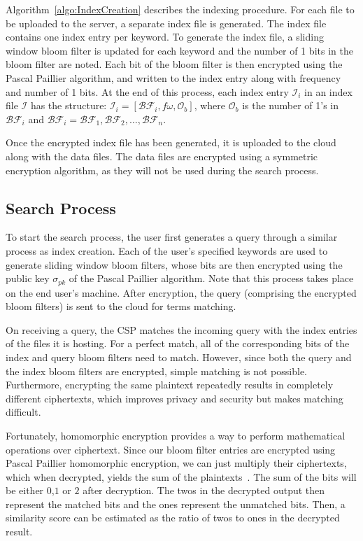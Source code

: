 Algorithm~\ref{algo:IndexCreation} describes the indexing procedure.
For each file to be uploaded to the server, a separate index file is generated. The index
file contains one index entry per keyword. To generate the index file, a sliding window bloom
filter is updated for each keyword and the number of 1 bits in the bloom filter are noted.
Each bit of the bloom filter is then encrypted using the Pascal Paillier algorithm, and written to 
the index entry along with frequency and number of 1 bits.
At the end of this process, each index entry $\mathcal{I}_i$ in an index file $\mathcal{I}$ has
the structure: 
$
\mathcal{I}_i = [\mathcal{BF}_i, f\omega,\mathcal{O}_b]
$,
where $\mathcal{O}_b$ is the number of 1's in 
$\mathcal{BF}_i$ and 
$\mathcal{BF}_i= \mathcal{BF}_1,\mathcal{BF}_2, \ldots ,\mathcal{BF}_n$.

Once the encrypted index file has been generated, it is uploaded to the cloud along with the data files.
The data files are encrypted using a symmetric encryption algorithm, as they will not be used during the
search process.

\subsection{Search Process}

To start the search process, the user first generates a query through a similar process as index creation. 
Each of the user's specified keywords are used to generate sliding window bloom filters, whose bits are then
encrypted using the public key $\sigma_{pk}$ of the Pascal Paillier algorithm. 
Note that this process takes place on the end user's machine. After encryption, 
the query (comprising the encrypted bloom filters) is sent to the cloud for terms matching.

On receiving a query, the CSP matches the incoming query with the index entries of 
the files it is hosting. For a perfect match, all of the corresponding bits of the index 
and query bloom filters need to match. However, since both the query and the index
bloom filters are encrypted, simple matching is not possible. Furthermore, encrypting the
same plaintext repeatedly results in completely different ciphertexts, which improves
privacy and security but makes matching difficult.

Fortunately, homomorphic encryption provides a way to perform mathematical operations 
over ciphertext. Since our bloom filter entries are encrypted using Pascal Paillier homomorphic
encryption, we can just multiply their ciphertexts, which when decrypted, yields the sum of
the plaintexts~\cite{pascal}. The sum of the bits will be either $0$,$1$ or $2$ after decryption.
The twos in the decrypted output then represent the matched
bits and the ones represent the unmatched bits. Then, a similarity score
can be estimated as the ratio of twos to ones in the decrypted result.

